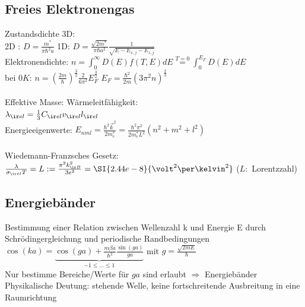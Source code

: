 \documentclass[fs, footer]{latex4ei}
\begin{document}
\begin{multicols*}{4}
{		\subsection{Freies Elektronengas}
	Zustandsdichte 3D: \\
	2D : $D = \frac{m^*}{\pi \hbar^2 a}$ \qquad 1D: $D = \frac{\sqrt{2m^*}}{\pi \hbar a^2} \frac{1}{\sqrt{E - E_{x,j} - E_{z,j}}}$\\
	Elektronendichte: $n = \int_0^\infty D(E)f(T,E)dE \overset{T=0}{=}\int_0^{E_F} D(E)dE $\\
	bei $0K$: $n = (\frac{2m}{\hbar})^{\frac{3}{2}} \frac{2}{6\pi^2}E_F^{\frac{3}{2}}$ \quad $E_F = \frac{\hbar^2}{2m}(3\pi^2n)^{\frac{2}{3}}$\\ \\
	Effektive Masse: \quad \quad \quad \quad \quad Wärmeleitfähigkeit: \\ 
	 \quad \quad $\lambda_{\ir el} = \frac 1 3 C_{\ir el} v_{\ir el} l_{\ir el}$\\ 
	Energieeigenwerte: $E_{nml} = \frac{\hbar^2 \vec k^2}{2 m_e^*} = \frac{\hbar^2 \pi^2}{2 m_e^* L^2} (n^2 + m^2 + l^2)$\\
	\\
	Wiedemann-Franzsches Gesetz: \\$\frac{\lambda}{\sigma_{\ir el} T} = L := \frac{\pi^2 k^2_{\ir B}}{3 e^2} = \SI{2.44e-8}{\volt^2\per\kelvin^2}$ \quad ($L:$ Lorentzzahl)
}

\subsection{Energiebänder}
Bestimmung einer Relation zwischen Wellenzahl k und Energie E durch Schrödingergleichung und periodische Randbedingungen\\
$\cos(ka) = \underbrace{\cos(ga) + \frac{m\beta a}{\hbar^2} \frac{\sin(ga)}{ga}}_{-1 \leq \hdots \leq 1}$ mit $g = \frac{\sqrt{2mE}}{\hbar}$\\
Nur bestimme Bereiche/Werte für $ga$ sind erlaubt $\Rightarrow$ Energiebänder\\
Physikalische Deutung: stehende Welle, keine fortschreitende Ausbreitung in eine Raumrichtung\\

\end{multicols*}
\end{document}
